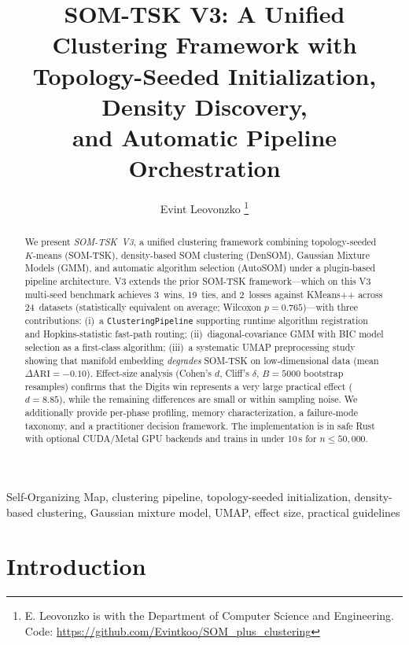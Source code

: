 \documentclass[journal]{IEEEtran}
\begin{document}
\title{SOM-TSK V3: A Unified Clustering Framework with\\Topology-Seeded Initialization, Density Discovery,\\and Automatic Pipeline Orchestration}

\author{Evint Leovonzko%
\thanks{E. Leovonzko is with the Department of Computer Science and Engineering. Code: \protect\url{https://github.com/Evintkoo/SOM\_plus\_clustering}}}

\maketitle

\begin{abstract}
We present \textit{SOM-TSK~V3}, a unified clustering framework combining topology-seeded $K$-means (SOM-TSK), density-based SOM clustering (DenSOM), Gaussian Mixture Models (GMM), and automatic algorithm selection (AutoSOM) under a plugin-based pipeline architecture.
V3 extends the prior SOM-TSK framework---which on this V3 multi-seed benchmark achieves 3~wins, 19~ties, and 2~losses against KMeans++ across 24~datasets (statistically equivalent on average; Wilcoxon $p = 0.765$)---with three contributions:
(i)~a \texttt{ClusteringPipeline} supporting runtime algorithm registration and Hopkins-statistic fast-path routing;
(ii)~diagonal-covariance GMM with BIC model selection as a first-class algorithm;
(iii)~a systematic UMAP preprocessing study showing that manifold embedding \emph{degrades} SOM-TSK on low-dimensional data (mean $\Delta\mathrm{ARI} = -0.10$).
Effect-size analysis (Cohen's $d$, Cliff's $\delta$, $B{=}5000$ bootstrap resamples) confirms that the Digits win represents a very large practical effect ($d = 8.85$), while the remaining differences are small or within sampling noise.
We additionally provide per-phase profiling, memory characterization, a failure-mode taxonomy, and a practitioner decision framework.
The implementation is in safe Rust with optional CUDA/Metal GPU backends and trains in under 10\,s for $n \le 50{,}000$.
\end{abstract}

\begin{IEEEkeywords}
Self-Organizing Map, clustering pipeline, topology-seeded initialization, density-based clustering, Gaussian mixture model, UMAP, effect size, practical guidelines
\end{IEEEkeywords}


\section{Introduction}
\label{sec:introduction}
\end{document}
